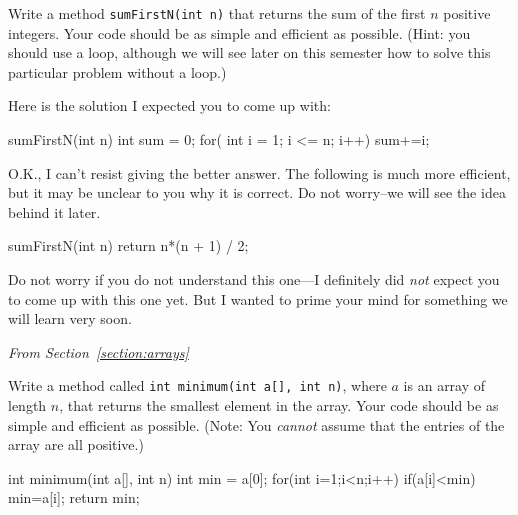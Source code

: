 \begin{requ}
Write a method \verb+sumFirstN(int n)+ that returns the sum of the first $n$ positive integers.
Your code should be as simple and efficient as possible.
(Hint: you should use a loop, although we will see later on this semester how to solve this particular
problem without a loop.)
\begin{requanswer}
Here is the solution I expected you to come up with:
\begin{code}
sumFirstN(int n) {
	int sum = 0; 
	for( int i = 1; i <= n; i++) {
		sum+=i; 
	}
}
\end{code}
O.K., I can't resist giving the better answer. The following is much more efficient, but it may
be unclear to you why it is correct. Do not worry--we will see the idea behind it later.
\begin{code}
sumFirstN(int n) {
	return n*(n + 1) / 2;
}
\end{code}
Do not worry if you do not understand this one---I 
definitely did {\em not} expect you to come up with this one yet.
But I wanted to prime your mind for something we will learn very soon.
\end{requanswer}
\end{requ}

\medskip 

\noindent
{\em From Section~\ref{section:arrays}}

\begin{requ}
Write a method called \verb+int minimum(int a[], int n)+, where $a$ is an array of length $n$,
that returns the smallest element in the array. 
Your code should be as simple and efficient as possible.
(Note: You {\em cannot} assume that the entries of the array are all positive.)
\begin{requanswer}
\begin{code}
int minimum(int a[], int n) {
    int min = a[0];
    for(int i=1;i<n;i++) {
        if(a[i]<min) {
            min=a[i];
        }
    }
    return min;
}
\end{code}
\end{requanswer}
\end{requ}

